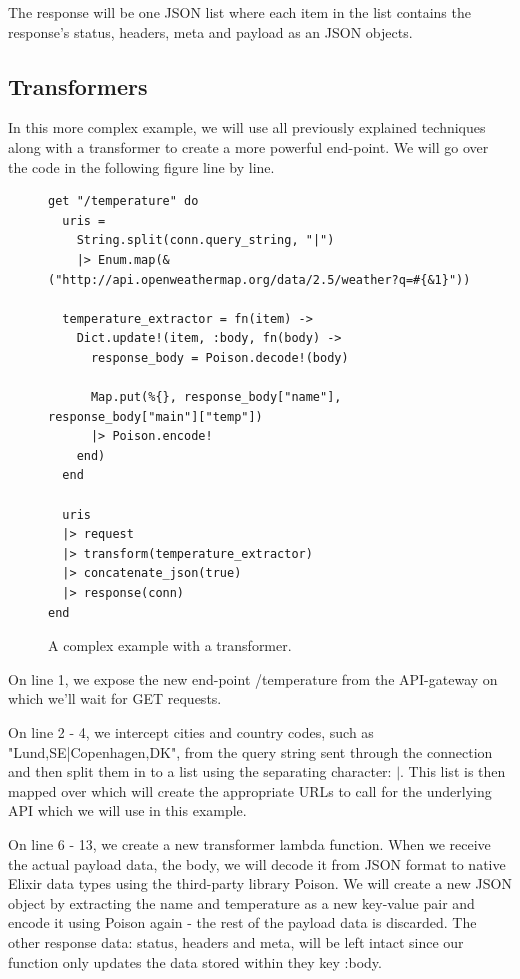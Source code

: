 \documentclass{cslthse-msc}
\begin{document}
The response will be one JSON list where each item  in the list contains the response's status, headers, meta and payload as an JSON objects.

\subsection{Transformers}
In this more complex example, we will use all previously explained techniques along with a transformer to create a more powerful end-point. We will go over the code in the following figure line by line.

\begin{figure}[H]
  \centering
\begin{lstlisting}[breaklines=true,frame=single]
get "/temperature" do
  uris =
    String.split(conn.query_string, "|")
    |> Enum.map(&("http://api.openweathermap.org/data/2.5/weather?q=#{&1}"))

  temperature_extractor = fn(item) ->
    Dict.update!(item, :body, fn(body) ->
      response_body = Poison.decode!(body)

      Map.put(%{}, response_body["name"], response_body["main"]["temp"])
      |> Poison.encode!
    end)
  end

  uris
  |> request
  |> transform(temperature_extractor)
  |> concatenate_json(true)
  |> response(conn)
end
\end{lstlisting}
  \caption{A complex example with a transformer.}
\end{figure}

On line 1, we expose the new end-point /temperature from the API-gateway on which we'll wait for GET requests.

On line 2 - 4, we intercept cities and country codes, such as "Lund,SE|Copenhagen,DK", from the query string sent through the connection and then split them in to a list using the separating character: $|$. This list is then mapped over which will create the appropriate URLs to call for the underlying API which we will use in this example.

On line 6 - 13, we create a new transformer lambda function. When we receive the actual payload data, the body, we will decode it from JSON format to native Elixir data types using the third-party library Poison\cite{poison}. We will create a new JSON object by extracting the name and temperature as a new key-value pair and encode it using Poison again - the rest of the payload data is discarded. The other response data: status, headers and meta, will be left intact since our function only updates the data stored within they key :body.
\end{document}
